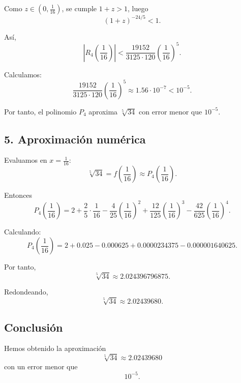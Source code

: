 \documentclass[12pt]{article}
\begin{document}
Como \(z\in\left(0,\frac{1}{16}\right)\), se cumple \(1+z>1\), luego
\[
(1+z)^{-24/5}<1.
\]

Así,
\[
\left|R_4\left(\frac{1}{16}\right)\right|
<
\frac{19152}{3125\cdot 120}\left(\frac{1}{16}\right)^5.
\]

Calculamos:
\[
\frac{19152}{3125\cdot 120}\left(\frac{1}{16}\right)^5
\approx 1.56\cdot 10^{-7}<10^{-5}.
\]

Por tanto, el polinomio \(P_4\) aproxima \(\sqrt[5]{34}\) con error menor que \(10^{-5}\).

\subsection*{5. Aproximación numérica}

Evaluamos en \(x=\frac{1}{16}\):
\[
\sqrt[5]{34}=f\left(\frac{1}{16}\right)\approx P_4\left(\frac{1}{16}\right).
\]

Entonces
\[
P_4\left(\frac{1}{16}\right)
=
2+\frac{2}{5}\cdot\frac{1}{16}
-\frac{4}{25}\left(\frac{1}{16}\right)^2
+\frac{12}{125}\left(\frac{1}{16}\right)^3
-\frac{42}{625}\left(\frac{1}{16}\right)^4.
\]

Calculando:
\[
P_4\left(\frac{1}{16}\right)
=
2+0.025-0.000625+0.0000234375-0.000001640625.
\]

Por tanto,
\[
\sqrt[5]{34}\approx 2.024396796875.
\]

Redondeando,
\[
\boxed{\sqrt[5]{34}\approx 2.02439680}.
\]

\subsection*{Conclusión}

Hemos obtenido la aproximación
\[
\boxed{\sqrt[5]{34}\approx 2.02439680}
\]
con un error menor que
\[
\boxed{10^{-5}}.
\]
\end{document}
